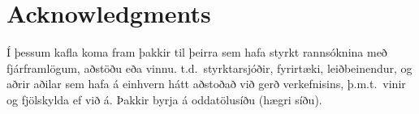 \documentclass[a4paper,12pt,twoside,BCOR=10mm]{scrbook}
\begin{document}
\chapter*{Acknowledgments}
Í þessum kafla koma fram þakkir til þeirra sem hafa styrkt rannsóknina með fjárframlögum, aðstöðu eða vinnu. t.d.\ styrktarsjóðir, fyrirtæki, leiðbeinendur, og aðrir aðilar sem hafa á einhvern hátt aðstoðað við gerð verkefnisins, þ.m.t.\ vinir og fjölskylda ef við á. Þakkir byrja á oddatölusíðu (hægri síðu).

\setcounter{page}{1}







\end{document}
